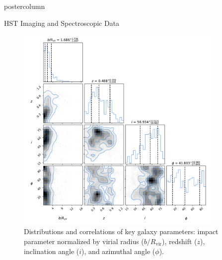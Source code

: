 \documentclass{beamer}
\newcommand*\arcsec{\ensuremath{^{\prime\prime}}}
\begin{document}
\begin{frame}
\begin{columns}[T]
\begin{column}{0.48\textwidth}
\begin{beamercolorbox}[center,wd=\textwidth]{postercolumn}
\begin{block}{HST Imaging and Spectroscopic Data}
          \begin{figure}
            \begin{minipage}{\textwidth}
              \centering
              \includegraphics[width=0.9\textwidth]{./images/corner_plot.pdf}
              \caption{Distributions and correlations of key galaxy parameters: impact parameter normalized by virial radius ($b/R_{\text{vir}}$), redshift ($z$), inclination angle ($i$), and azimuthal angle ($\phi$).}

\end{minipage}
\end{figure}
\end{block}
\end{beamercolorbox}
\end{column}
\end{columns}
\end{frame}
\end{document}
